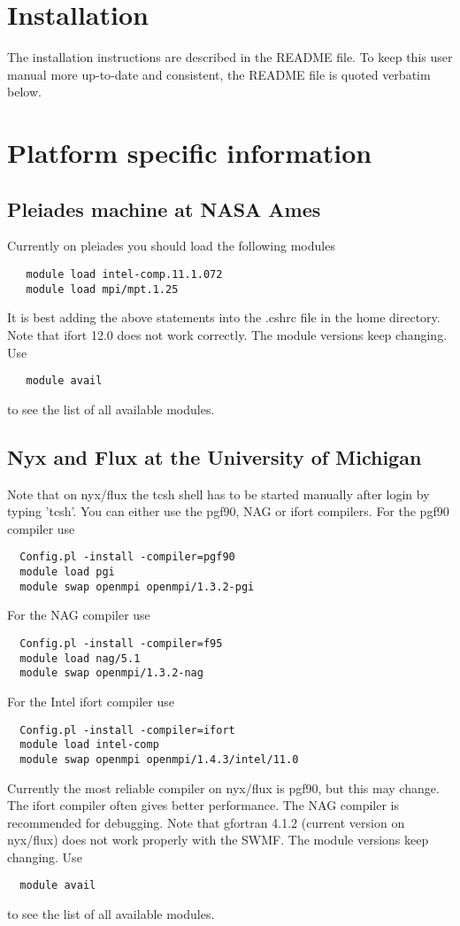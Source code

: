 \section{Installation}

The installation instructions are described in the README file.
To keep this user manual more up-to-date and consistent, 
the README file is quoted verbatim below.



\section{Platform specific information}

\subsection{Pleiades machine at NASA Ames}

Currently on pleiades you should load the following modules
\begin{verbatim}
   module load intel-comp.11.1.072
   module load mpi/mpt.1.25
\end{verbatim}
It is best adding the above statements into the .cshrc file in the 
home directory.
Note that ifort 12.0 does not work correctly.
The module versions keep changing. Use
\begin{verbatim}
   module avail
\end{verbatim}
to see the list of all available modules.

\subsection{Nyx and Flux at the University of Michigan}

Note that on nyx/flux the tcsh shell has to be started manually after login
by typing 'tcsh'. You can either use the pgf90, NAG or ifort compilers. 
For the pgf90 compiler use
\begin{verbatim}
  Config.pl -install -compiler=pgf90
  module load pgi
  module swap openmpi openmpi/1.3.2-pgi
\end{verbatim}
For the NAG compiler use
\begin{verbatim}
  Config.pl -install -compiler=f95
  module load nag/5.1
  module swap openmpi/1.3.2-nag
\end{verbatim}
For the Intel ifort compiler use
\begin{verbatim}
  Config.pl -install -compiler=ifort
  module load intel-comp
  module swap openmpi openmpi/1.4.3/intel/11.0
\end{verbatim}
Currently the most reliable compiler on nyx/flux is pgf90, 
but this may change. The ifort compiler often gives better performance.
The NAG compiler is recommended for debugging.
Note that gfortran 4.1.2 (current version on nyx/flux) 
does not work properly with the SWMF.
The module versions keep changing. Use
\begin{verbatim}
  module avail
\end{verbatim}
to see the list of all available modules.

